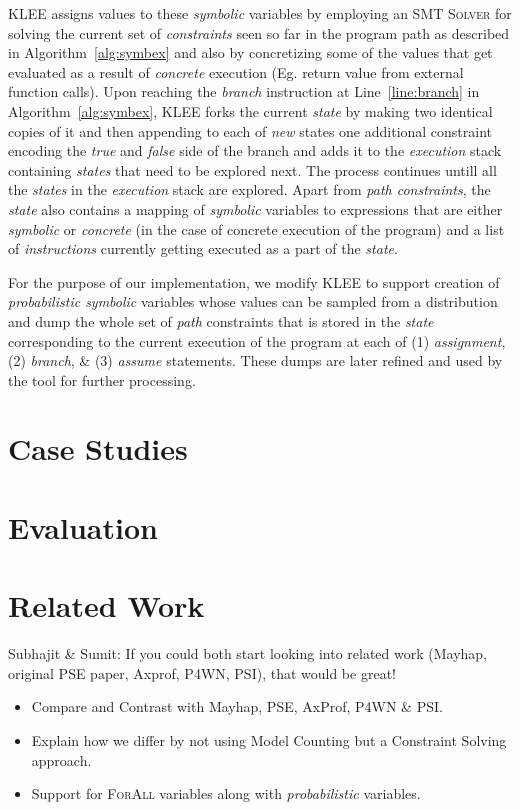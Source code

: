 \documentclass[acmsmall]{acmart}\settopmatter{}
\begin{document}
	\textsc{KLEE} assigns values to these \textit{symbolic} variables by employing an \textsc{SMT Solver} for solving the current set of \textit{constraints} seen so far in the program path as described in Algorithm~\ref{alg:symbex} and also by concretizing some of the values that get evaluated as a result of \textit{concrete} execution (Eg. return value from external function calls). Upon reaching the \textit{branch} instruction at Line~\ref{line:branch} in Algorithm~\ref{alg:symbex}, \textsc{KLEE} forks the current \textit{state} by making two identical copies of it and then appending to each of \textit{new} states one additional constraint encoding the \textit{true} and \textit{false} side of the branch and adds it to the \textit{execution} stack containing \textit{states} that need to be explored next. The process continues untill all the \textit{states} in the \textit{execution} stack are explored. Apart from \textit{path constraints}, the \textit{state} also contains a mapping of \textit{symbolic} variables to expressions that are either  \textit{symbolic} or \textit{concrete} (in the case of concrete execution of the program) and a list of \textit{instructions} currently getting executed as a part of the \textit{state}.	
	
	For the purpose of our implementation, we modify \textsc{KLEE} to support creation of \textit{probabilistic symbolic} variables whose values can be sampled from a distribution and dump the whole set of \textit{path} constraints that is stored in the \textit{state} corresponding to the current execution of the program at each of (1) \textit{assignment}, (2) \textit{branch}, \& (3) \textit{assume} statements. These dumps are later refined and used by the tool for further processing.
	\section{Case Studies}
	\label{sec:case_studies}
	
	\section{Evaluation}
	\label{sec:eval}
	
	\section{Related Work}
	\label{sec:related}
	{\color{red} Subhajit \& Sumit: If you could both start looking into related work (Mayhap, original PSE paper, Axprof, P4WN, PSI), that would be great!}
	\begin{itemize}
		\item Compare and Contrast with Mayhap, PSE, AxProf, P4WN \& PSI.
		\item Explain how we differ by not using Model Counting but a Constraint Solving approach.
		\item Support for \textsc{ForAll} variables along with \textit{probabilistic} variables. 
	\end{itemize}
\end{document}
